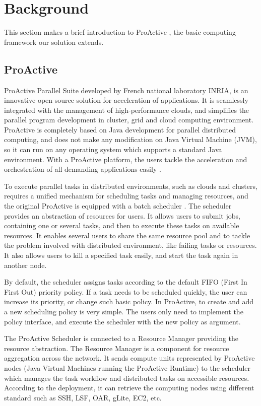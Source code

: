 \section{Background}

This section makes a brief introduction to ProActive \cite{huet04high}, the basic
computing framework our solution extends.

\subsection{ProActive}

ProActive Parallel Suite developed by French national laboratory INRIA, is an innovative
open-source solution for acceleration of applications. It is seamlessly integrated with
the management of high-performance clouds, and simplifies the parallel program development
in cluster, grid and cloud computing environment. ProActive is completely based on Java
development for parallel distributed computing, and does not make any modification on Java
Virtual Machine (JVM), so it can run on any operating system which supports a standard
Java environment. With a ProActive platform, the users tackle the acceleration and
orchestration of all demanding applications easily \cite{ProActive}.

To execute parallel tasks in distributed environments, such as clouds and clusters,
requires a unified mechanism for scheduling tasks and managing resources, and the original
ProActive is equipped with a batch scheduler \cite{ProActiveScheduling}. The scheduler
provides an abstraction of resources for users. It allows users to submit jobs, containing
one or several tasks, and then to execute these tasks on available resources. It enables
several users to share the same resource pool and to tackle the problem involved with
distributed environment, like failing tasks or resources. It also allows users to kill a
specified task easily, and start the task again in another node.

By default, the scheduler assigns tasks according to the default FIFO (First In First Out)
priority policy. If a task needs to be scheduled quickly, the user can increase its
priority, or change such basic policy. In ProActive, to create and add a new scheduling
policy is very simple. The users only need to implement the policy interface, and execute
the scheduler with the new policy as argument.

The ProActive Scheduler \cite{pascheduling} is connected to a Resource Manager \cite{parm}
providing the resource abstraction. The Resource Manager is a component for resource
aggregation across the network. It sends compute units represented by ProActive nodes
(Java Virtual Machines running the ProActive Runtime)   to the scheduler which manages the
task workflow and distributed tasks on accessible resources. According to the deployment,
it can retrieve the computing nodes using different standard such as SSH, LSF, OAR, gLite,
EC2, etc.

